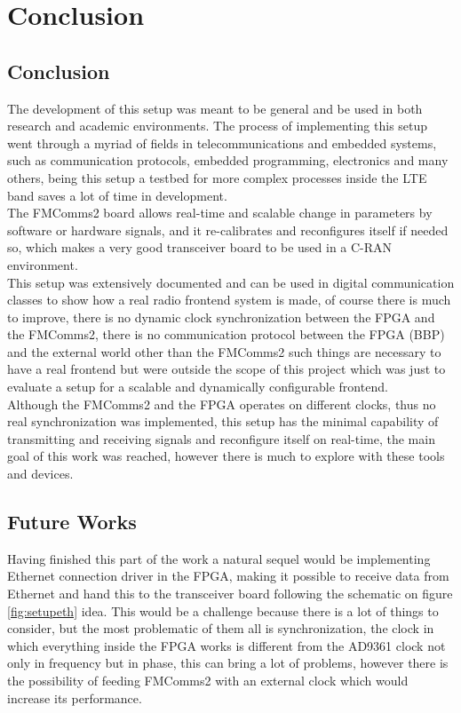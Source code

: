 \chapter{Conclusion}
\label{chap:conclusion}

\section{Conclusion}
\label{sec:conclusion}

The development of this setup was meant to be general and be used in both
research and academic environments. The process of implementing this setup went
through a myriad of fields in telecommunications and embedded systems, such as
communication protocols, embedded programming, electronics and many others,
being this setup a testbed for more complex processes inside the LTE band saves
a lot of time in development. \\

The FMComms2 board allows real-time and scalable change in parameters by
software or hardware signals, and it re-calibrates and reconfigures itself if
needed so, which makes a very good transceiver board to be used in a C-RAN
environment.\\

This setup was extensively documented and can be used in digital communication
classes to show how a real radio frontend system is made, of course there is
much to improve, there is no dynamic clock synchronization between the FPGA and
the FMComms2, there is no communication protocol between the FPGA (BBP) and the
external world other than the FMComms2 such things are necessary to have a real
frontend but were outside the scope of this project which was just to evaluate a
setup for a scalable and dynamically configurable frontend.\\

Although the FMComms2 and the FPGA operates on different clocks, thus no real
synchronization was implemented, this setup has the minimal capability of
transmitting and receiving signals and reconfigure itself on real-time, the main
goal of this work was reached, however there is much to explore with these tools
and devices.

\section{Future Works}
\label{sec:futurew}

Having finished this part of the work a natural sequel would be implementing
Ethernet connection driver in the FPGA, making it possible to receive data from
Ethernet and hand this to the transceiver board following the schematic on
figure \ref{fig:setupeth} idea. This would be a challenge because there is a lot
of things to consider, but the most problematic of them all is synchronization,
the clock in which everything inside the FPGA works is different from the AD9361
clock not only in frequency but in phase, this can bring a lot of problems,
however there is the possibility of feeding FMComms2 with an external clock
which would increase its performance.\\

